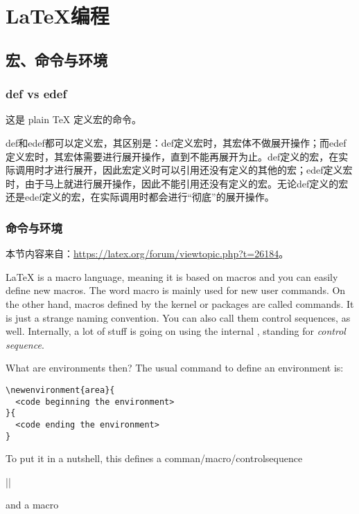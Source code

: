 \chapter{{\LaTeX 编程}}

\section{宏、命令与环境}

\subsection{def vs edef}

这是 plain {\TeX} 定义宏的命令。

def和edef都可以定义宏，其区别是：def定义宏时，其宏体不做展开操作；而edef定义宏时，其宏体需要进行展开操作，直到不能再展开为止。def定义的宏，在实际调用时才进行展开，因此宏定义时可以引用还没有定义的其他的宏；edef定义宏时，由于马上就进行展开操作，因此不能引用还没有定义的宏。无论def定义的宏还是edef定义的宏，在实际调用时都会进行“彻底”的展开操作。

\subsection{命令与环境}

本节内容来自：\url{https://latex.org/forum/viewtopic.php?t=26184}。

{\LaTeX} is a macro language, meaning it is based on macros and you can easily define new macros. The word macro is mainly used for new user commands. On the other hand, macros defined by the kernel or packages are called commands. It is just a strange naming convention.
You can also call them control sequences, as well. Internally, a lot of stuff is going on using the internal ,  standing for \textit{control sequence}.

What are environments then? The usual command to define an environment is:

\begin{verbatim}
\newenvironment{area}{
  <code beginning the environment>
}{
  <code ending the environment>
}
\end{verbatim}

To put it in a nutshell, this defines a comman/macro/controlsequence 

|\newcommand{\area}{<code beginning the environment>}|

and a macro 

